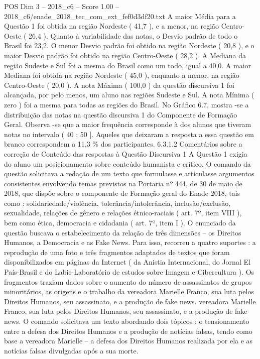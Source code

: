 \begin{textsample}{POS Dim 3 – 2018\_c6 – Score 1.00 – 2018\_c6/enade\_2018\_tec\_com\_ext\_fef0d3df20.txt}
A maior Média para a Questão 1 foi obtida na região Nordeste ( 41,7 ), e a menor, na região Centro-Oeste ( 26,4 ).
Quanto à variabilidade das notas, o Desvio padrão de todo o Brasil foi 23,2.
O menor Desvio padrão foi obtido na região Nordeste ( 20,8 ), e o maior Desvio padrão foi obtido na região Centro-Oeste ( 28,2 ).
A Mediana da região Sudeste e Sul foi a mesma do Brasil como um todo, igual a 40,0.
A maior Mediana foi obtida na região Nordeste ( 45,0 ), enquanto a menor, na região Centro-Oeste ( 20,0 ).
A nota Máxima ( 100,0 ) da questão discursiva 1 foi alcançada, por pelo menos, um aluno nas regiões Sudeste e Sul.
A nota Mínima ( zero ) foi a mesma para todas as regiões do Brasil.
No Gráfico 6.7, mostra -se a distribuição das notas na questão discursiva 1 do Componente de Formação Geral.
Observa -se que a maior frequência corresponde à dos alunos que tiveram notas no intervalo ( 40 ; 50 ].
Aqueles que deixaram a resposta a essa questão em branco correspondem a 11,3 \% dos participantes. 6.3.1.2 Comentários sobre a correção de Conteúdo das respostas à Questão Discursiva 1 A Questão 1 exigia do aluno um posicionamento sobre conteúdo humanista e crítico.
O comando da questão solicitava a redação de um texto que formulasse e articulasse argumentos consistentes envolvendo temas previstos na Portaria nº 444, de 30 de maio de 2018, que dispõe sobre o componente de Formação geral do Enade 2018, tais como : solidariedade/violência, tolerância/intolerância, inclusão/exclusão, sexualidade, relações de gênero e relações étnico-raciais ( art. 7º, item VIII ), bem como ética, democracia e cidadania ( art. 7º, item I ).
O enunciado da questão buscava o estabelecimento da relação de três dimensões – os Direitos Humanos, a Democracia e as Fake News.
Para isso, recorreu a quatro suportes : a reprodução de uma foto e três fragmentos adaptados de textos que foram disponibilizados em páginas da Internet ( da Anistia Internacional, do Jornal El País-Brasil e do Labic-Laboratório de estudos sobre Imagem e Cibercultura ).
Os fragmentos traziam dados sobre o aumento do número de assassinatos de grupos minoritários, as origens e o trabalho da vereadora Marielle Franco, sua luta pelos Direitos Humanos, seu assassinato, e a produção de fake news. vereadora Marielle Franco, sua luta pelos Direitos Humanos, seu assassinato, e a produção de fake news.
O comando solicitava um texto abordando dois tópicos : o tensionamento entre a defesa dos Direitos Humanos e a produção de notícias falsas, tendo como base a vereadora Marielle – a defesa dos Direitos Humanos realizada por ela e as notícias falsas divulgadas após a sua morte.

\end{textsample}
